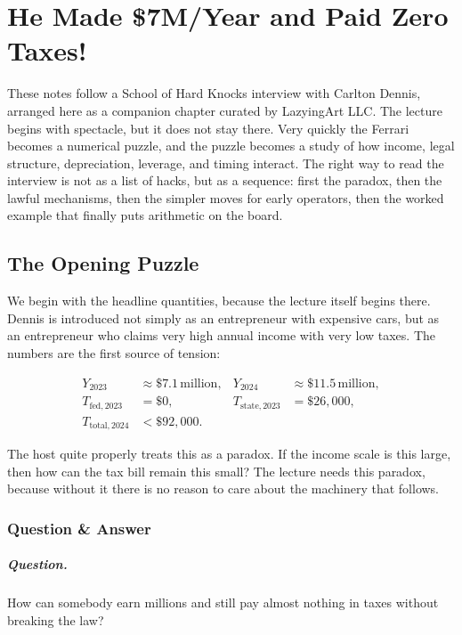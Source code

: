 \chapter{He Made \$7M/Year and Paid Zero Taxes!}

These notes follow a School of Hard Knocks interview with Carlton Dennis, arranged here as a companion chapter curated by LazyingArt LLC. The lecture begins with spectacle, but it does not stay there. Very quickly the Ferrari becomes a numerical puzzle, and the puzzle becomes a study of how income, legal structure, depreciation, leverage, and timing interact. The right way to read the interview is not as a list of hacks, but as a sequence: first the paradox, then the lawful mechanisms, then the simpler moves for early operators, then the worked example that finally puts arithmetic on the board.

\section{The Opening Puzzle}

We begin with the headline quantities, because the lecture itself begins there. Dennis is introduced not simply as an entrepreneur with expensive cars, but as an entrepreneur who claims very high annual income with very low taxes. The numbers are the first source of tension:

\begin{align}
Y_{2023} &\approx \$7.1\,\text{million}, &
Y_{2024} &\approx \$11.5\,\text{million}, \\
T_{\mathrm{fed},2023} &= \$0, &
T_{\mathrm{state},2023} &= \$26{,}000, \\
T_{\mathrm{total},2024} &< \$92{,}000. &&
\end{align}

The host quite properly treats this as a paradox. If the income scale is this large, then how can the tax bill remain this small? The lecture needs this paradox, because without it there is no reason to care about the machinery that follows.

\subsection{Question \& Answer}

\paragraph{Question.} How can somebody earn millions and still pay almost nothing in taxes without breaking the law?

